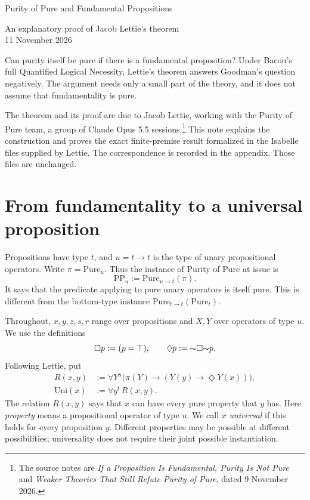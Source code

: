 \documentclass[12pt,leqno]{article}
\newcommand{\IC}{\ensuremath{\rightarrow}}
\newcommand{\NOT}{\ensuremath{\text{$\thicksim$}}}
\newcommand{\Pure}{\ensuremath{\mathrm{Pure}}}
\newcommand{\Uni}{\ensuremath{\mathrm{Uni}}}
\newcommand{\PPu}{\ensuremath{\mathrm{PP}_u}}
\theoremstyle{plain}
\begin{document}
\begin{center}
{\Large Purity of Pure and Fundamental Propositions}

\smallskip
An explanatory proof of Jacob Lettie's theorem\\
11 November 2026
\end{center}

\noindent
Can purity itself be pure if there is a fundamental proposition? Under
Bacon's full Quantified Logical Necessity, Lettie's theorem answers
Goodman's question negatively. The argument needs only a small part of
the theory, and it does not assume that fundamentality is pure.

The theorem and its proof are due to Jacob Lettie, working with the
Purity of Pure team, a group of Claude Opus 5.5 sessions.\footnote{The
source notes are \emph{If a Proposition Is Fundamental, Purity Is Not Pure}
and \emph{Weaker Theories That Still Refute Purity of Pure}, dated
9 November 2026.} This note explains the construction and proves the exact
finite-premise result formalized in the Isabelle files supplied by Lettie.
The correspondence is recorded in the appendix. Those files are unchanged.

\section{From fundamentality to a universal proposition}

Propositions have type \(t\), and \(u=t\IC t\) is the type of unary
propositional operators. Write \(\pi=\Pure_u\). Thus the instance of
Purity of Pure at issue is
\[
 \PPu:=\Pure_{u\IC t}(\pi).
\]
It says that the predicate applying to pure unary operators is itself
pure. This is different from the bottom-type instance
\(\Pure_{t\IC t}(\Pure_t)\).

Throughout, \(x,y,z,s,r\) range over propositions and \(X,Y\) over operators
of type \(u\). We use the definitions
\[
 \Box p:=(p=\top),\qquad \Diamond p:=\NOT\Box\NOT p.
\]
Following Lettie, put
\begin{align}
 R(x,y)&:=\forall Y^u\bigl(\pi(Y)\IC(Y(y)\IC\Diamond Y(x))\bigr),
       \label{eq:R}\\
 \Uni(x)&:=\forall y^t\,R(x,y). \label{eq:Uni}
\end{align}
The relation \(R(x,y)\) says that \(x\) can have every pure property that
\(y\) has. Here \emph{property} means a propositional operator of type \(u\).
We call \(x\) \emph{universal} if this holds for every proposition \(y\).
Different properties may be possible at different possibilities; universality
does not require their joint possible instantiation.
\end{document}
